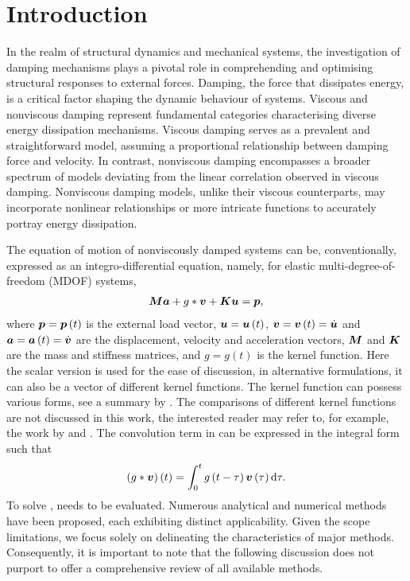 \section{Introduction}
In the realm of structural dynamics and mechanical systems, the investigation of damping mechanisms plays a pivotal role in comprehending and optimising structural responses to external forces. Damping, the force that dissipates energy, is a critical factor shaping the dynamic behaviour of systems. Viscous and nonviscous damping represent fundamental categories characterising diverse energy dissipation mechanisms. Viscous damping serves as a prevalent and straightforward model, assuming a proportional relationship between damping force and velocity. In contrast, nonviscous damping encompasses a broader spectrum of models deviating from the linear correlation observed in viscous damping. Nonviscous damping models, unlike their viscous counterparts, may incorporate nonlinear relationships or more intricate functions to accurately portray energy dissipation.

The equation of motion of nonviscously damped systems can be, conventionally, expressed as an integro-differential equation, namely, for elastic multi-degree-of-freedom (MDOF) systems,
\begin{gather}\label{eq:single_eom}
\bm{M}\bm{a}+g*\bm{v}+\bm{K}\bm{u}=\bm{p},
\end{gather}
where $\bm{p}=\bm{p}\left(t\right)$ is the external load vector, $\bm{u}=\bm{u}\left(t\right)$, $\bm{v}=\bm{v}\left(t\right)=\dot{\bm{u}}$ and $\bm{a}=\bm{a}\left(t\right)=\dot{\bm{v}}$ are the displacement, velocity and acceleration vectors, $\bm{M}$ and $\bm{K}$ are the mass and stiffness matrices, and $g=g(t)$ is the kernel function. Here the scalar version is used for the ease of discussion, in alternative formulations, it can also be a vector of different kernel functions. The kernel function can possess various forms, see a summary by \citet[][Table 1]{Adhikari2003}. The comparisons of different kernel functions are not discussed in this work, the interested reader may refer to, for example, the work by \citet{Impraimakis2022} and \citet{Impraimakis2023}. The convolution term in  can be expressed in the integral form such that
\begin{gather}\label{eq:conv}
\left(g*\bm{v}\right)\left(t\right)=\int_0^tg\left(t-\tau\right)\bm{v}\left(\tau\right)\mathrm{d}\tau.
\end{gather}
To solve ,  needs to be evaluated. Numerous analytical and numerical methods have been proposed, each exhibiting distinct applicability. Given the scope limitations, we focus solely on delineating the characteristics of major methods. Consequently, it is important to note that the following discussion does not purport to offer a comprehensive review of all available methods.
